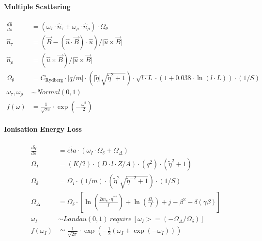 \documentclass[review]{elsarticle}
\begin{document}
\paragraph{Multiple Scattering}
\begin{equation} \begin{alignedat}{-1}
    \frac{d\hat{u}}{ds}&=(\omega_{\tau}\cdot\hat{n}_{\tau}+\omega_{\rho}\cdot\hat{n}_{\rho})\cdot\Omega_{\theta} \\
    \hat{n}_{\tau}&=(\vec{B}-(\hat{u}\cdot\vec{B})\cdot\hat{u})/\bigr|\hat{u}\times\vec{B}\bigl| \\
    \hat{n}_{\rho}&=(\hat{u}\times\vec{B})/\bigr|\hat{u}\times\vec{B}\bigl| \\
    \Omega_{\theta}&=C_{\text{Rydberg}}\cdot\bigl|q/m\bigr|\cdot(\bigl|\tilde{\eta}\bigr|\sqrt{\tilde{\eta}^{2}+1})\cdot\sqrt{l\cdot L}\cdot(1+0.038\cdot\ln{(l\cdot L)})\cdot(1/S)\\
    \omega_{\tau},\omega_{\rho}&\sim Normal\left(0,1\right) \\
    f\left(\omega\right)&=\frac{1}{\sqrt{2\pi}}\cdot\exp{\left(-\frac{\omega^{2}}{2}\right)}
\end{alignedat} \end{equation} 

\paragraph{Ionisation Energy Loss}
\begin{equation} \begin{alignedat}{-1}
    \frac{d\tilde{\eta}}{ds}&=\tilde{eta}\cdot\left(\omega_{I}\cdot\Omega_{\delta}+\Omega_{\Delta}\right) \\
    \Omega_{I}&=(K/2)\cdot(D\cdot l\cdot Z/A)\cdot(q^{2})\cdot(\tilde{\eta}^{2}+1) \\
    \Omega_{\delta}&=\Omega_{I}\cdot(1/m)\cdot(\tilde{\eta}^{2}\sqrt{\tilde{\eta}^{-2}+1})\cdot(1/S) \\
    \Omega_{\Delta}&=\Omega_{\delta}\cdot\left[\ln{\left(\frac{2m_{e}\cdot \tilde{\eta}^{-2}}{I}\right)}+\ln{\left(\frac{\Omega_{I}}{I}\right)}+j-{\beta}^{2}-\delta(\gamma\beta)\right] \\
    \omega_{I}&\sim Landau\left(0,1\right)\ require\ \left[\omega_{I}>=(-\Omega_{\Delta}/\Omega_{\delta})\right] \\
    f\left(\omega_{I}\right)&\simeq\frac{1}{\sqrt{2\pi}}\cdot\exp{\left(-\frac{1}{2}\left(\omega_{I}+\exp{(-\omega_{I})}\right)\right)}
\end{alignedat} \end{equation} 
\end{document}
